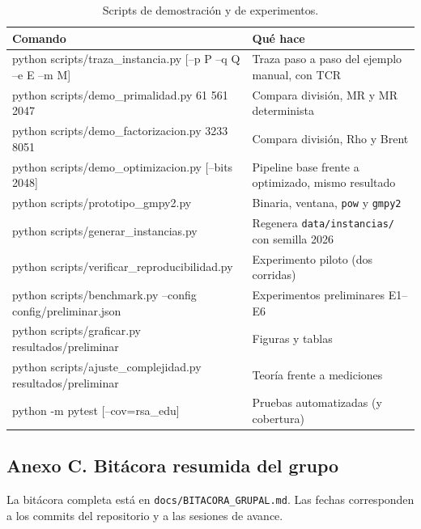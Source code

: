 \begin{table}[H]
\centering\small
\caption{Scripts de demostración y de experimentos.}
\begin{tabularx}{\linewidth}{@{}>{\ttfamily\footnotesize}R{7.8cm} Y@{}}
\toprule
\textrm{\textbf{Comando}} & \textbf{Qué hace}\\
\midrule
python scripts/traza\_instancia.py [--p P --q Q --e E --m M] & Traza paso a paso del ejemplo manual, con TCR\\
python scripts/demo\_primalidad.py 61 561 2047 & Compara división, MR y MR determinista\\
python scripts/demo\_factorizacion.py 3233 8051 & Compara división, Rho y Brent\\
python scripts/demo\_optimizacion.py [--bits 2048] & Pipeline base frente a optimizado, mismo resultado\\
python scripts/prototipo\_gmpy2.py & Binaria, ventana, \texttt{pow} y \texttt{gmpy2}\\
python scripts/generar\_instancias.py & Regenera \texttt{data/instancias/} con semilla 2026\\
python scripts/verificar\_reproducibilidad.py & Experimento piloto (dos corridas)\\
python scripts/benchmark.py --config config/preliminar.json & Experimentos preliminares E1--E6\\
python scripts/graficar.py resultados/preliminar & Figuras y tablas\\
python scripts/ajuste\_complejidad.py resultados/preliminar & Teoría frente a mediciones\\
python -m pytest [--cov=rsa\_edu] & Pruebas automatizadas (y cobertura)\\
\bottomrule
\end{tabularx}
\end{table}



\subsection{Anexo C. Bitácora resumida del grupo}
\label{anx:bitacora}

La bitácora completa está en \texttt{docs/BITACORA\_GRUPAL.md}. Las fechas
corresponden a los commits del repositorio y a las sesiones de avance.

